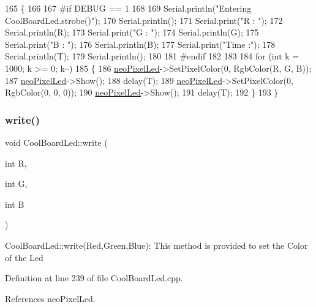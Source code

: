 \begin{DoxyCode}
165 \{
166 
167 \textcolor{preprocessor}{#if DEBUG == 1}
168 
169     Serial.println(\textcolor{stringliteral}{"Entering CoolBoardLed.strobe()"});
170     Serial.println();
171     Serial.print(\textcolor{stringliteral}{"R : "});
172     Serial.println(R);
173     Serial.print(\textcolor{stringliteral}{"G : "});
174     Serial.println(G);
175     Serial.print(\textcolor{stringliteral}{"B : "});
176     Serial.println(B);
177     Serial.print(\textcolor{stringliteral}{"Time :"});
178     Serial.println(T);
179     Serial.println();
180 
181 \textcolor{preprocessor}{#endif  }
182 
183     
184     \textcolor{keywordflow}{for} (\textcolor{keywordtype}{int} k = 1000; k >= 0; k--) 
185     \{
186         \hyperlink{classCoolBoardLed_ac2c13fa462a010cd9242bf297c013923}{neoPixelLed}->SetPixelColor(0, RgbColor(R, G, B));
187         \hyperlink{classCoolBoardLed_ac2c13fa462a010cd9242bf297c013923}{neoPixelLed}->Show();
188         delay(T);
189         \hyperlink{classCoolBoardLed_ac2c13fa462a010cd9242bf297c013923}{neoPixelLed}->SetPixelColor(0, RgbColor(0, 0, 0));
190         \hyperlink{classCoolBoardLed_ac2c13fa462a010cd9242bf297c013923}{neoPixelLed}->Show();
191         delay(T);
192     \}
193 \}
\end{DoxyCode}
\mbox{\label{classCoolBoardLed_a30fadd4cbec17ceea428bf7a32207e87}} 
\subsubsection{\texorpdfstring{write()}{write()}}
{\footnotesize\ttfamily void Cool\+Board\+Led\+::write (\begin{DoxyParamCaption}\item[{int}]{R,  }\item[{int}]{G,  }\item[{int}]{B }\end{DoxyParamCaption})}

Cool\+Board\+Led\+::write(\+Red,\+Green,\+Blue)\+: This method is provided to set the Color of the Led 

Definition at line 239 of file Cool\+Board\+Led.\+cpp.



References neo\+Pixel\+Led.


